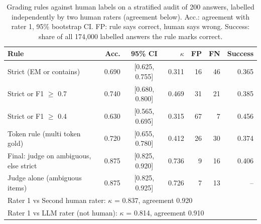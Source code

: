 \begin{table}[t]
\centering
\caption{Grading rules against human labels on a stratified audit of 200 answers, labelled independently by two human raters (agreement below). Acc.: agreement with rater 1, 95\% bootstrap CI. FP: rule says correct, human says wrong. Success: share of all 174{,}000 labelled answers the rule marks correct.}
\label{tab:grading}
\scriptsize
\setlength{\tabcolsep}{3pt}
\begin{tabular}{lrcrrrr}
\toprule
Rule & Acc. & 95\% CI & $\kappa$ & FP & FN & Success \\
\midrule
Strict (EM or contains) & 0.690 & [0.625, 0.755] & 0.311 & 16 & 46 & 0.365 \\
Strict or F1 $\geq$ 0.7 & 0.740 & [0.680, 0.800] & 0.469 & 31 & 21 & 0.385 \\
Strict or F1 $\geq$ 0.4 & 0.630 & [0.565, 0.695] & 0.315 & 67 & 7 & 0.456 \\
Token rule (multi token gold) & 0.720 & [0.655, 0.780] & 0.412 & 26 & 30 & 0.374 \\
Final: judge on ambiguous, else strict & 0.875 & [0.825, 0.920] & 0.736 & 9 & 16 & 0.406 \\
Judge alone (ambiguous items) & 0.875 & [0.825, 0.925] & 0.726 & 7 & 13 & -- \\
\midrule
\multicolumn{7}{l}{Rater 1 vs Second human rater: $\kappa$ = 0.837, agreement 0.920} \\
\multicolumn{7}{l}{Rater 1 vs LLM rater (not human): $\kappa$ = 0.814, agreement 0.910} \\
\bottomrule
\end{tabular}
\end{table}